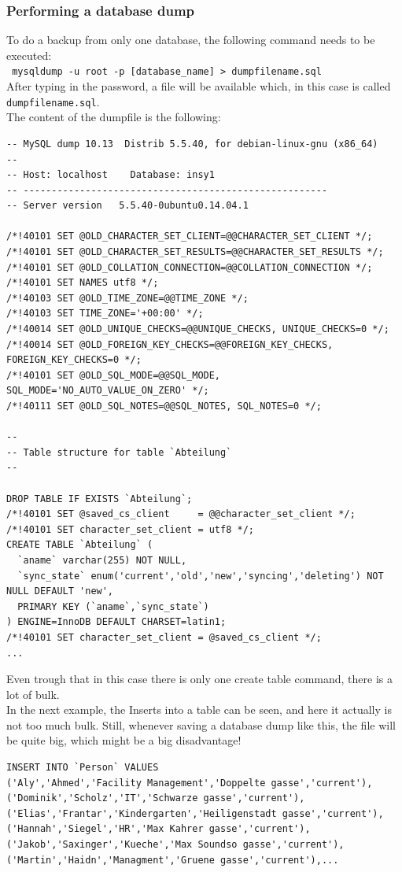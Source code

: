 \documentclass[10pt]{article}
\begin{document}
\subsubsection{Performing a database dump}
To do a backup from only one database, the following command needs to be executed: \\
\texttt{ mysqldump -u root -p [database\_name] \textgreater ~dumpfilename.sql } \\
After typing in the password, a file will be available which, in this case is called \texttt{dumpfilename.sql}.\\ 
The content of the dumpfile is the following:
\begin{lstlisting}    
-- MySQL dump 10.13  Distrib 5.5.40, for debian-linux-gnu (x86_64)
--
-- Host: localhost    Database: insy1
-- ------------------------------------------------------
-- Server version	5.5.40-0ubuntu0.14.04.1

/*!40101 SET @OLD_CHARACTER_SET_CLIENT=@@CHARACTER_SET_CLIENT */;
/*!40101 SET @OLD_CHARACTER_SET_RESULTS=@@CHARACTER_SET_RESULTS */;
/*!40101 SET @OLD_COLLATION_CONNECTION=@@COLLATION_CONNECTION */;
/*!40101 SET NAMES utf8 */;
/*!40103 SET @OLD_TIME_ZONE=@@TIME_ZONE */;
/*!40103 SET TIME_ZONE='+00:00' */;
/*!40014 SET @OLD_UNIQUE_CHECKS=@@UNIQUE_CHECKS, UNIQUE_CHECKS=0 */;
/*!40014 SET @OLD_FOREIGN_KEY_CHECKS=@@FOREIGN_KEY_CHECKS, FOREIGN_KEY_CHECKS=0 */;
/*!40101 SET @OLD_SQL_MODE=@@SQL_MODE, SQL_MODE='NO_AUTO_VALUE_ON_ZERO' */;
/*!40111 SET @OLD_SQL_NOTES=@@SQL_NOTES, SQL_NOTES=0 */;

--
-- Table structure for table `Abteilung`
--

DROP TABLE IF EXISTS `Abteilung`;
/*!40101 SET @saved_cs_client     = @@character_set_client */;
/*!40101 SET character_set_client = utf8 */;
CREATE TABLE `Abteilung` (
  `aname` varchar(255) NOT NULL,
  `sync_state` enum('current','old','new','syncing','deleting') NOT NULL DEFAULT 'new',
  PRIMARY KEY (`aname`,`sync_state`)
) ENGINE=InnoDB DEFAULT CHARSET=latin1;
/*!40101 SET character_set_client = @saved_cs_client */;
...
\end{lstlisting}    
Even trough that in this case there is only one create table command, there is a lot of bulk. \\
In the next example, the Inserts into a table can be seen, and here it actually is not too much bulk.
Still, whenever saving a database dump like this, the file will be quite big, which might be a big disadvantage! 
\begin{lstlisting}    
INSERT INTO `Person` VALUES 
('Aly','Ahmed','Facility Management','Doppelte gasse','current'),
('Dominik','Scholz','IT','Schwarze gasse','current'),
('Elias','Frantar','Kindergarten','Heiligenstadt gasse','current'),
('Hannah','Siegel','HR','Max Kahrer gasse','current'),
('Jakob','Saxinger','Kueche','Max Soundso gasse','current'),
('Martin','Haidn','Managment','Gruene gasse','current'),...
\end{lstlisting}    
\end{document}
